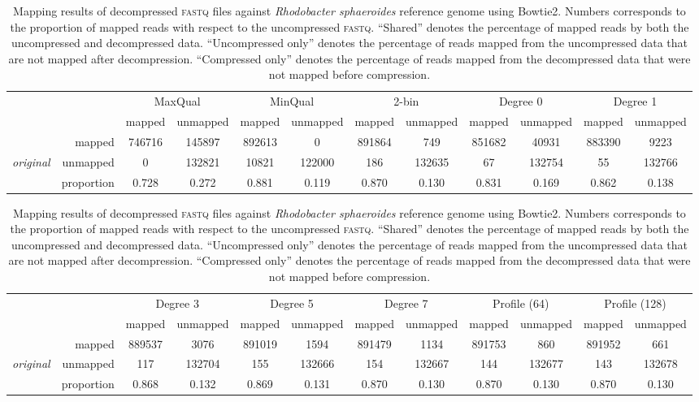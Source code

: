 \begin{table}[!tbhp]
\centering
\caption[]{Mapping results of decompressed \textsc{fastq} files
  against \textit{Rhodobacter sphaeroides} reference genome using
  Bowtie2. Numbers corresponds to the proportion of mapped reads with
  respect to the uncompressed \textsc{fastq}. ``Shared'' denotes the
  percentage of mapped reads by both the uncompressed and decompressed
  data. ``Uncompressed only'' denotes the percentage of reads mapped
  from the uncompressed data that are not mapped after
  decompression. ``Compressed only'' denotes the percentage of reads
  mapped from the decompressed data that were not mapped before
  compression.}
\begin{tabular}{lr|cc|cc|cc|cc|cc}
 & & \multicolumn{2}{c|}{MaxQual} & \multicolumn{2}{c|}{MinQual} & \multicolumn{2}{c|}{2-bin} & \multicolumn{2}{c|}{Degree 0} & \multicolumn{2}{c}{Degree 1} \\
& & mapped & unmapped & mapped & unmapped & mapped & unmapped & mapped & unmapped & mapped & unmapped \\
\cline{2-12}
& mapped & 746716 & 145897 & 892613 &   0 & 891864 & 749 & 851682 & 40931 & 883390 & 9223 \\
{\em original} & unmapped &   0 & 132821 & 10821 & 122000 & 186 & 132635 &  67 & 132754 &  55 & 132766 \\
\cline{2-12}
& proportion & 0.728 & 0.272 & 0.881 & 0.119 & 0.870 & 0.130 & 0.831 & 0.169 & 0.862 & 0.138 \\
\end{tabular}

\bigskip

\begin{tabular}{lr|cc|cc|cc|cc|cc}
 & & \multicolumn{2}{c|}{Degree 3} & \multicolumn{2}{c|}{Degree 5} & \multicolumn{2}{c|}{Degree 7} & \multicolumn{2}{c|}{Profile (64)} & \multicolumn{2}{c}{Profile (128)} \\
& & mapped & unmapped & mapped & unmapped & mapped & unmapped & mapped & unmapped & mapped & unmapped \\
\cline{2-12}
& mapped & 889537 & 3076 & 891019 & 1594 & 891479 & 1134 & 891753 & 860 & 891952 & 661 \\
{\em original} & unmapped & 117 & 132704 & 155 & 132666 & 154 & 132667 & 144 & 132677 & 143 & 132678 \\
\cline{2-12}
& proportion & 0.868 & 0.132 & 0.869 & 0.131 & 0.870 & 0.130 & 0.870 & 0.130 & 0.870 & 0.130 \\
\end{tabular}


\end{table}
